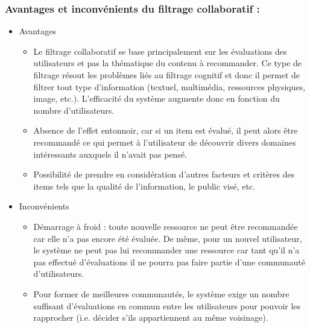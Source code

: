 \documentclass[a4paper,12pt,letterpaper,headsepline,singlespacing,headsepline, french]{report}
\begin{document}
\subsubsection*{Avantages et inconvénients du filtrage collaboratif \cite{ref11}:}
\begin{itemize}
	\item Avantages 
	\begin{itemize}
		\item Le filtrage collaboratif se base principalement sur les évaluations des utilisateurs et pas la thématique du contenu à recommander. Ce type de filtrage résout les problèmes liés au filtrage cognitif et donc il permet de filtrer tout type d’information (textuel, multimédia, ressources physiques, image, etc.). L’efficacité du système augmente donc en fonction du nombre d’utilisateurs.
		\item Absence de l’effet entonnoir, car si un item est évalué, il peut alors être recommandé ce qui permet à l’utilisateur de découvrir divers domaines intéressants auxquels il n’avait pas pensé. 
		\item Possibilité de prendre en considération d’autres facteurs et critères des items tels que la qualité de l’information, le public visé, etc. 
	\end{itemize}
	\item Inconvénients
	\begin{itemize}
		\item Démarrage à froid : toute nouvelle ressource ne peut être recommandée car elle n’a pas encore été évaluée. De même, pour un nouvel utilisateur, le système ne peut pas lui recommander une ressource car tant qu’il n’a pas effectué d’évaluations il ne pourra pas faire partie d’une communauté d’utilisateurs.
		\item Pour former de meilleures communautés, le système exige un nombre suffisant d’évaluations en commun entre les utilisateurs pour pouvoir les rapprocher (i.e. décider s’ils appartiennent au même voisinage).		
	\end{itemize}
\end{itemize}
\end{document}
